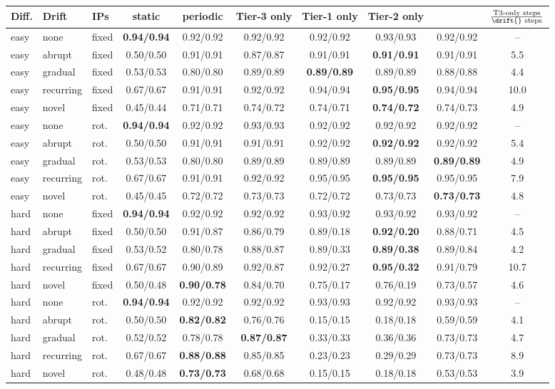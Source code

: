 \begin{tabular}{@{}lllccccccc@{}}
\toprule
Diff. & Drift & IPs & static & periodic & Tier-3 only & Tier-1 only & Tier-2 only & \drift{} & $\frac{\text{T3-only steps}}{\text{\drift{} steps}}$ \\
\midrule
easy & none & fixed & \textbf{0.94/0.94} & 0.92/0.92 & 0.92/0.92 & 0.92/0.92 & 0.93/0.93 & 0.92/0.92 & -- \\
easy & abrupt & fixed & 0.50/0.50 & 0.91/0.91 & 0.87/0.87 & 0.91/0.91 & \textbf{0.91/0.91} & 0.91/0.91 & 5.5 \\
easy & gradual & fixed & 0.53/0.53 & 0.80/0.80 & 0.89/0.89 & \textbf{0.89/0.89} & 0.89/0.89 & 0.88/0.88 & 4.4 \\
easy & recurring & fixed & 0.67/0.67 & 0.91/0.91 & 0.92/0.92 & 0.94/0.94 & \textbf{0.95/0.95} & 0.94/0.94 & 10.0 \\
easy & novel & fixed & 0.45/0.44 & 0.71/0.71 & 0.74/0.72 & 0.74/0.71 & \textbf{0.74/0.72} & 0.74/0.73 & 4.9 \\
easy & none & rot. & \textbf{0.94/0.94} & 0.92/0.92 & 0.93/0.93 & 0.92/0.92 & 0.92/0.92 & 0.92/0.92 & -- \\
easy & abrupt & rot. & 0.50/0.50 & 0.91/0.91 & 0.91/0.91 & 0.92/0.92 & \textbf{0.92/0.92} & 0.92/0.92 & 5.4 \\
easy & gradual & rot. & 0.53/0.53 & 0.80/0.80 & 0.89/0.89 & 0.89/0.89 & 0.89/0.89 & \textbf{0.89/0.89} & 4.9 \\
easy & recurring & rot. & 0.67/0.67 & 0.91/0.91 & 0.92/0.92 & 0.95/0.95 & \textbf{0.95/0.95} & 0.95/0.95 & 7.9 \\
easy & novel & rot. & 0.45/0.45 & 0.72/0.72 & 0.73/0.73 & 0.72/0.72 & 0.73/0.73 & \textbf{0.73/0.73} & 4.8 \\
hard & none & fixed & \textbf{0.94/0.94} & 0.92/0.92 & 0.92/0.92 & 0.93/0.92 & 0.93/0.92 & 0.93/0.92 & -- \\
hard & abrupt & fixed & 0.50/0.50 & 0.91/0.87 & 0.86/0.79 & 0.89/0.18 & \textbf{0.92/0.20} & 0.88/0.71 & 4.5 \\
hard & gradual & fixed & 0.53/0.52 & 0.80/0.78 & 0.88/0.87 & 0.89/0.33 & \textbf{0.89/0.38} & 0.89/0.84 & 4.2 \\
hard & recurring & fixed & 0.67/0.67 & 0.90/0.89 & 0.92/0.87 & 0.92/0.27 & \textbf{0.95/0.32} & 0.91/0.79 & 10.7 \\
hard & novel & fixed & 0.50/0.48 & \textbf{0.90/0.78} & 0.84/0.70 & 0.75/0.17 & 0.76/0.19 & 0.73/0.57 & 4.6 \\
hard & none & rot. & \textbf{0.94/0.94} & 0.92/0.92 & 0.92/0.92 & 0.93/0.93 & 0.92/0.92 & 0.93/0.93 & -- \\
hard & abrupt & rot. & 0.50/0.50 & \textbf{0.82/0.82} & 0.76/0.76 & 0.15/0.15 & 0.18/0.18 & 0.59/0.59 & 4.1 \\
hard & gradual & rot. & 0.52/0.52 & 0.78/0.78 & \textbf{0.87/0.87} & 0.33/0.33 & 0.36/0.36 & 0.73/0.73 & 4.7 \\
hard & recurring & rot. & 0.67/0.67 & \textbf{0.88/0.88} & 0.85/0.85 & 0.23/0.23 & 0.29/0.29 & 0.73/0.73 & 8.9 \\
hard & novel & rot. & 0.48/0.48 & \textbf{0.73/0.73} & 0.68/0.68 & 0.15/0.15 & 0.18/0.18 & 0.53/0.53 & 3.9 \\
\bottomrule
\end{tabular}